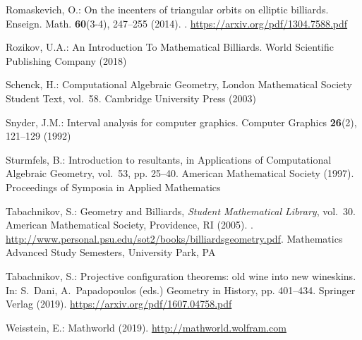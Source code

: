 \begin{thebibliography}{10}
Romaskevich, O.: On the incenters of triangular orbits on elliptic billiards.
\newblock Enseign. Math. \textbf{60}(3-4), 247--255 (2014).
\newblock {}.
\newblock \urlprefix\url{https://arxiv.org/pdf/1304.7588.pdf}

Rozikov, U.A.: An Introduction To Mathematical Billiards.
\newblock World Scientific Publishing Company (2018)

Schenck, H.: Computational Algebraic Geometry, London Mathematical Society
  Student Text, vol.~58.
\newblock Cambridge University Press (2003)

Snyder, J.M.: Interval analysis for computer graphics.
\newblock Computer Graphics \textbf{26}(2), 121--129 (1992)

Sturmfels, B.: Introduction to resultants, in Applications of Computational
  Algebraic Geometry, vol.~53, pp. 25--40.
\newblock American Mathematical Society (1997).
\newblock Proceedings of Symposia in Applied Mathematics

Tabachnikov, S.: Geometry and Billiards, \emph{Student Mathematical Library},
  vol.~30.
\newblock American Mathematical Society, Providence, RI (2005).
\newblock {}.
\newblock
  \urlprefix\url{http://www.personal.psu.edu/sot2/books/billiardsgeometry.pdf}.
\newblock Mathematics Advanced Study Semesters, University Park, PA

Tabachnikov, S.: Projective configuration theorems: old wine into new
  wineskins.
\newblock In: S.~Dani, A.~Papadopoulos (eds.) Geometry in History, pp.
  401--434. Springer Verlag (2019).
\newblock \urlprefix\url{https://arxiv.org/pdf/1607.04758.pdf}

Weisstein, E.: Mathworld (2019).
\newblock \urlprefix\url{http://mathworld.wolfram.com}

\end{thebibliography}
